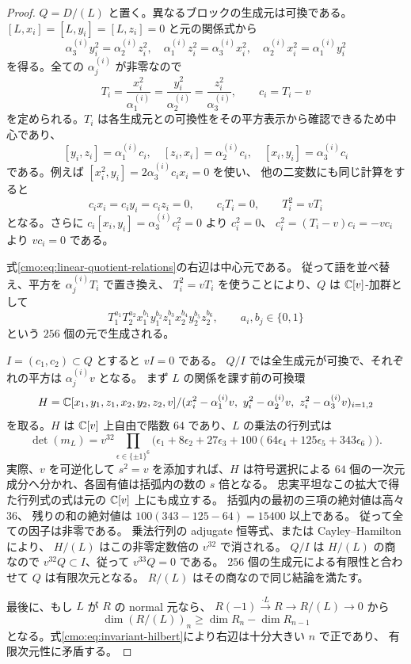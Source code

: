 \begin{proof}
$Q=D/(L)$ と置く。異なるブロックの生成元は可換である。
$[L,x_i]=[L,y_i]=[L,z_i]=0$ と元の関係式から
\[
 \alpha^{(i)}_3y_i^2=\alpha^{(i)}_2z_i^2,\quad
 \alpha^{(i)}_1z_i^2=\alpha^{(i)}_3x_i^2,\quad
 \alpha^{(i)}_2x_i^2=\alpha^{(i)}_1y_i^2
\]
を得る。全ての $\alpha^{(i)}_j$ が非零なので
\[
 T_i=\frac{x_i^2}{\alpha^{(i)}_1}
     =\frac{y_i^2}{\alpha^{(i)}_2}
     =\frac{z_i^2}{\alpha^{(i)}_3},\qquad c_i=T_i-v
\]
を定められる。$T_i$ は各生成元との可換性をその平方表示から確認できるため中心であり、
\begin{equation}\label{cmo:eq:linear-quotient-relations}
 [y_i,z_i]=\alpha^{(i)}_1c_i,\quad
 [z_i,x_i]=\alpha^{(i)}_2c_i,\quad
 [x_i,y_i]=\alpha^{(i)}_3c_i
\end{equation}
である。例えば $[x_i^2,y_i]=2\alpha^{(i)}_3c_ix_i=0$ を使い、
他の二変数にも同じ計算をすると
\[
 c_ix_i=c_iy_i=c_iz_i=0,\qquad
 c_iT_i=0,\qquad T_i^2=vT_i
\]
となる。さらに $c_i[x_i,y_i]=\alpha^{(i)}_3c_i^2=0$ より $c_i^2=0$、
$c_i^2=(T_i-v)c_i=-vc_i$ より $vc_i=0$ である。

式\eqref{cmo:eq:linear-quotient-relations}の右辺は中心元である。
従って語を並べ替え、平方を $\alpha^{(i)}_jT_i$ で置き換え、
$T_i^2=vT_i$ を使うことにより、$Q$ は $\mathbb C[v]$-加群として
\[
 T_1^{a_1}T_2^{a_2}
 x_1^{b_1}y_1^{b_2}z_1^{b_3}
 x_2^{b_4}y_2^{b_5}z_2^{b_6},
 \qquad a_i,b_j\in\{0,1\}
\]
という $256$ 個の元で生成される。

$I=(c_1,c_2)\subset Q$ とすると $vI=0$ である。
$Q/I$ では全生成元が可換で、それぞれの平方は $\alpha^{(i)}_jv$ となる。
まず $L$ の関係を課す前の可換環
\[
 H=\C[x_1,y_1,z_1,x_2,y_2,z_2,v]/
 (x_i^2-\alpha^{(i)}_1v,\ y_i^2-\alpha^{(i)}_2v,\ z_i^2-\alpha^{(i)}_3v)_{i=1,2}
\]
を取る。$H$ は $\mathbb C[v]$ 上自由で階数 $64$ であり、$L$ の乗法の行列式は
\begin{equation}\label{cmo:eq:linear-quotient-norm}
 \det(m_L)=v^{32}
 \prod_{\epsilon\in\{\pm1\}^6}
 \bigl(\epsilon_1+8\epsilon_2+27\epsilon_3
       +100(64\epsilon_4+125\epsilon_5+343\epsilon_6)\bigr).
\end{equation}
実際、$v$ を可逆化して $s^2=v$ を添加すれば、$H$ は符号選択による
$64$ 個の一次元成分へ分かれ、各固有値は括弧内の数の $s$ 倍となる。
忠実平坦なこの拡大で得た行列式の式は元の $\mathbb C[v]$ 上にも成立する。
括弧内の最初の三項の絶対値は高々 $36$、
残りの和の絶対値は $100(343-125-64)=15400$ 以上である。
従って全ての因子は非零である。
乗法行列の adjugate 恒等式、または Cayley--Hamilton により、
$H/(L)$ はこの非零定数倍の $v^{32}$ で消される。
$Q/I$ は $H/(L)$ の商なので $v^{32}Q\subset I$、従って $v^{33}Q=0$ である。
$256$ 個の生成元による有限性と合わせて $Q$ は有限次元となる。
$R/(L)$ はその商なので同じ結論を満たす。

最後に、もし $L$ が $R$ の normal 元なら、
$R(-1)\xrightarrow{\cdot L}R\to R/(L)\to0$ から
\[
 \dim(R/(L))_n\geq\dim R_n-\dim R_{n-1}
\]
となる。式\eqref{cmo:eq:invariant-hilbert}により右辺は十分大きい $n$ で正であり、
有限次元性に矛盾する。
\end{proof}

